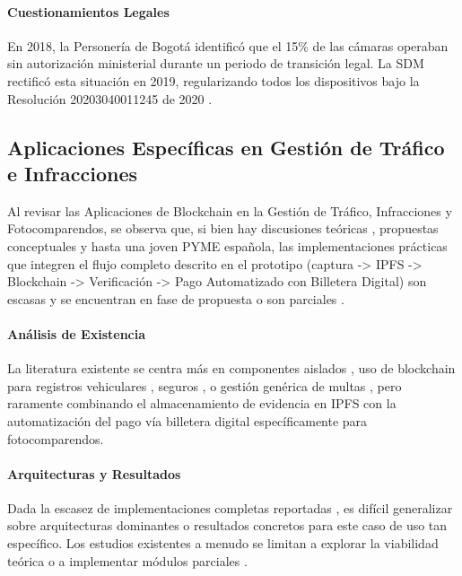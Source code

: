 \paragraph{Cuestionamientos Legales }
En 2018, la Personería de Bogotá identificó que el 15\% de las cámaras operaban sin autorización ministerial durante un periodo de transición legal. La SDM rectificó esta situación en 2019, regularizando todos los dispositivos bajo la Resolución 20203040011245 de 2020 \parencite{secretaria_movilidad2023}. 

\subsection{Aplicaciones Específicas en Gestión de Tráfico e Infracciones} 

Al revisar las Aplicaciones de Blockchain en la Gestión de Tráfico, Infracciones y Fotocomparendos, se observa que, si bien hay discusiones teóricas \parencite{yousfi2022its}, propuestas conceptuales \parencite{chen2024blockchain} y hasta una joven PYME española, las implementaciones prácticas que integren el flujo completo descrito en el prototipo (captura -> IPFS -> Blockchain -> Verificación -> Pago Automatizado con Billetera Digital) son escasas y se encuentran en fase de propuesta o son parciales \parencite{omar2024srtm,choquevilca2024blockchain}. 

\paragraph{Análisis de Existencia}
La literatura existente se centra más en componentes aislados \parencite{yousfi2022its}, uso de blockchain para registros vehiculares \parencite{ManiJosephP2023SmartAS}, seguros \parencite{dutta2023solution}, o gestión genérica de multas \parencite{omar2024srtm}, pero raramente combinando el almacenamiento de evidencia en IPFS con la automatización del pago vía billetera digital específicamente para fotocomparendos.

\paragraph{Arquitecturas y Resultados} Dada la escasez de implementaciones completas reportadas \parencite{AnandSingh_ProjectReport_Year,juit2024traffic}, es difícil generalizar sobre arquitecturas dominantes o resultados concretos para este caso de uso tan específico. Los estudios existentes a menudo se limitan a explorar la viabilidad teórica o a implementar módulos parciales \parencite{choquevilca2024blockchain}.

